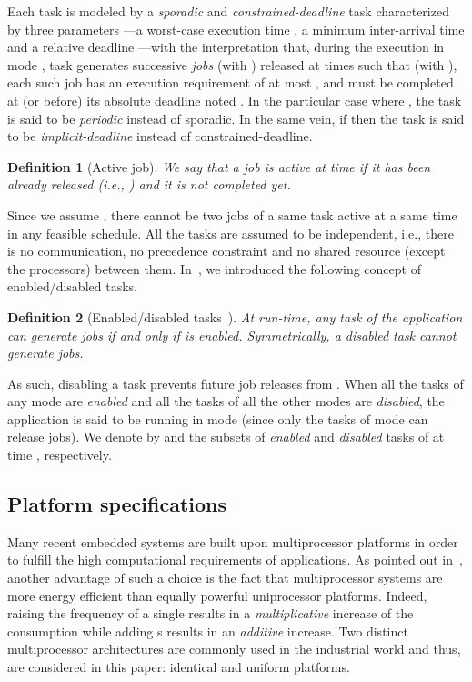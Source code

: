 \documentclass{article}
\newtheorem{Definition}{Definition}
\newtheorem{validity test}{Validity Test}
\begin{document}
Each task  is modeled by a \emph{sporadic} and \emph{constrained-deadline} task characterized by three parameters ---a worst-case execution time , a minimum inter-arrival time  and a relative deadline ---with the interpretation that, during the execution in mode , task  generates successive \emph{jobs}  (with ) released at times  such that  (with ), each such job has an execution requirement of at most , and must be completed at (or before) its absolute deadline noted . In the particular case where , the task  is said to be {\em periodic} instead of sporadic. In the same vein, if  then the task  is said to be {\em implicit-deadline} instead of constrained-deadline. 

\begin{Definition}[Active job]
We say that a job  is \emph{active} at time  if it has been already released (i.e., ) and it is not completed yet. 
\end{Definition}

Since we assume , there cannot be two jobs of a same task  active at a same time in any feasible schedule. All the tasks are assumed to be independent, i.e., there is no communication, no precedence constraint and no shared resource (except the processors) between them. In~\cite{NelisGoossensAndersson:09}, we introduced the following concept of enabled/disabled tasks.

\begin{Definition}[Enabled/disabled tasks~\cite{NelisGoossensAndersson:09}]
\label{def:Multimode:enabled_disabled}
At run-time, any task  of the application can generate jobs if and only if  is enabled. Symmetrically, a disabled task cannot generate jobs. 
\end{Definition}

As such, disabling a task  prevents future job releases from . When all the tasks of any mode  are \emph{enabled} and all the tasks of all the other modes are {\em disabled}, the application is said to be running in mode  (since only the tasks of mode  can release jobs). We denote by  and  the subsets of {\em enabled} and {\em disabled} tasks of  at time , respectively.  

\subsection{Platform specifications}

Many recent embedded systems are built upon multiprocessor platforms in order to fulfill the high computational requirements of applications. As pointed out in~\cite{Baruah:03, Baruah:04}, another advantage of such a choice is the fact that multiprocessor systems are more energy efficient than equally powerful uniprocessor platforms. Indeed, raising the frequency of a single  results in a \emph{multiplicative} increase of the consumption while adding s results in an \emph{additive} increase. Two distinct multiprocessor architectures are commonly used in the industrial world and thus, are considered in this paper: identical and uniform platforms.
\end{document}
